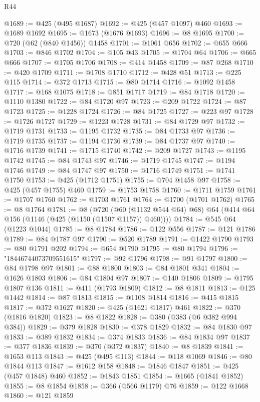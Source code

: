 \begin{lexlean}{R44}
\begin{coremodule}
@1689 := @425 (@495 @1687)
@1692 := @425 (@457 @1097) @460
@1693 := @1689 @1692
@1695 := @1673 (@1676 @1693)
@1696 := @8 @1695
@1700 := @720 (@62 (@840 @1456)) @1458
@1701 := @1061 @656
@1702 := @655 @666
@1703 := @846 @1702
@1704 := @105 @43
@1705 := @1704 @64
@1706 := @665 @666
@1707 := @1705 @1706
@1708 := @414 @1458
@1709 := @87 @268
@1710 := @420 @1709
@1711 := @1708 @1710
@1712 := @428 @51
@1713 := @225 @115
@1714 := @372 @1713
@1715 := @80 @1714
@1716 := @1092 @1458
@1717 := @168 @1075
@1718 := @851 @1717
@1719 := @84 @1718
@1720 := @1110 @1380
@1722 := @84 @1720 @97
@1723 := @209 @1722
@1724 := @87 @1723
@1725 := @1228 @1724
@1726 := @84 @1725
@1727 := @223 @97
@1728 := @1726 @1727
@1729 := @1223 @1728
@1731 := @84 @1729 @97
@1732 := @1719 @1731
@1733 := @1195 @1732
@1735 := @84 @1733 @97
@1736 := @1719 @1735
@1737 := @1194 @1736
@1739 := @84 @1737 @97
@1740 := @1716 @1739
@1741 := @1715 @1740
@1742 := @209 @1727
@1743 := @1195 @1742
@1745 := @84 @1743 @97
@1746 := @1719 @1745
@1747 := @1194 @1746
@1749 := @84 @1747 @97
@1750 := @1716 @1749
@1751 := @1741 @1750
@1753 := @425 (@1712 @1751)
@1755 := @704 @1458 @97
@1758 := @425 (@457 @1755) @460
@1759 := @1753 @1758
@1760 := @1711 @1759
@1761 := @1707 @1760
@1762 := @1703 @1761
@1764 := @1700 (@1701 @1762)
@1765 := @8 @1764
@1781 := @8
    (@720 (@60 (@1132 @544 @64) @68) @64 (@414 @64 @156 (@1146 (@425 (@1150 (@1507 @1157)) @460))))
@1784 := @545 @64 (@1223 @1044)
@1785 := @8 @1784
@1786 := @122 @556
@1787 := @121 @1786
@1789 := @84 @1787 @97
@1790 := @520 @1789
@1791 := @1422 @1790
@1793 := @80 @1791 @202
@1794 := @654 @1790
@1795 := @80 @1794
@1796 := "18446744073709551615"
@1797 := @92 @1796
@1798 := @91 @1797
@1800 := @84 @1798 @97
@1801 := @88 @1800
@1803 := @84 @1801 @341
@1804 := @1626 @1803
@1806 := @84 @1804 @97
@1807 := @140 @1806
@1809 := @1795 @1807 @136
@1811 := @411 (@1793 @1809)
@1812 := @8 @1811
@1813 := @125 @1442
@1814 := @87 @1813
@1815 := @1108 @1814
@1816 := @415 @1815
@1817 := @372 @1627
@1820 := @425 (@1621 @1817) @461
@1822 := @370 (@1816 @1820)
@1823 := @8 @1822
@1828 := @380 (@383 (@6 @382 @994 @384))
@1829 := @379 @1828
@1830 := @378 @1829
@1832 := @84 @1830 @97
@1833 := @389 @1832
@1834 := @374 @1833
@1836 := @84 @1834 @97
@1837 := @377 @1836
@1839 := @370 (@372 @1837)
@1840 := @8 @1839
@1841 := @1653 @113
@1843 := @425 (@495 @113)
@1844 := @118 @1069
@1846 := @80 @1844 @113
@1847 := @1612 @158
@1848 := @1846 @1847
@1851 := @425 (@457 @1848) @460
@1852 := @1843 @1851
@1854 := @1665 (@1841 @1852)
@1855 := @8 @1854
@1858 := @366 (@566 @1179) @76
@1859 := @122 @1668
@1860 := @121 @1859

\end{coremodule}
\end{lexlean}
